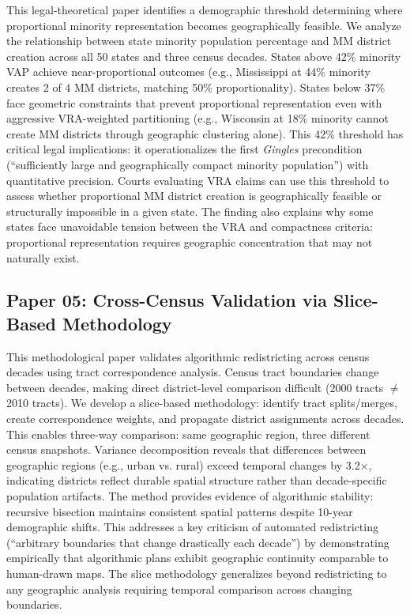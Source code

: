 \documentclass[11pt]{article}
\begin{document}
This legal-theoretical paper identifies a demographic threshold determining where proportional minority representation becomes geographically feasible. We analyze the relationship between state minority population percentage and MM district creation across all 50 states and three census decades. States above 42\% minority VAP achieve near-proportional outcomes (e.g., Mississippi at 44\% minority creates 2 of 4 MM districts, matching 50\% proportionality). States below 37\% face geometric constraints that prevent proportional representation even with aggressive VRA-weighted partitioning (e.g., Wisconsin at 18\% minority cannot create MM districts through geographic clustering alone). This 42\% threshold has critical legal implications: it operationalizes the first \emph{Gingles} precondition (``sufficiently large and geographically compact minority population'') with quantitative precision. Courts evaluating VRA claims can use this threshold to assess whether proportional MM district creation is geographically feasible or structurally impossible in a given state. The finding also explains why some states face unavoidable tension between the VRA and compactness criteria: proportional representation requires geographic concentration that may not naturally exist.

\subsection*{Paper 05: Cross-Census Validation via Slice-Based Methodology}

This methodological paper validates algorithmic redistricting across census decades using tract correspondence analysis. Census tract boundaries change between decades, making direct district-level comparison difficult (2000 tracts $\neq$ 2010 tracts). We develop a slice-based methodology: identify tract splits/merges, create correspondence weights, and propagate district assignments across decades. This enables three-way comparison: same geographic region, three different census snapshots. Variance decomposition reveals that differences between geographic regions (e.g., urban vs. rural) exceed temporal changes by 3.2×, indicating districts reflect durable spatial structure rather than decade-specific population artifacts. The method provides evidence of algorithmic stability: recursive bisection maintains consistent spatial patterns despite 10-year demographic shifts. This addresses a key criticism of automated redistricting (``arbitrary boundaries that change drastically each decade'') by demonstrating empirically that algorithmic plans exhibit geographic continuity comparable to human-drawn maps. The slice methodology generalizes beyond redistricting to any geographic analysis requiring temporal comparison across changing boundaries.
\end{document}

